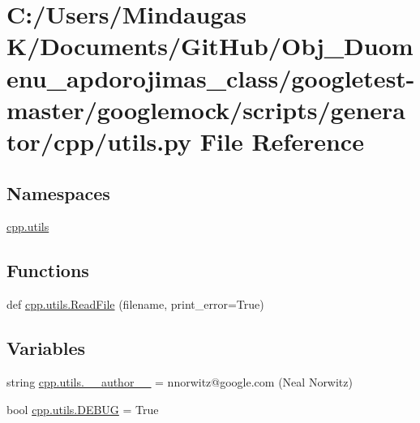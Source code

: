 \hypertarget{googletest-master_2googlemock_2scripts_2generator_2cpp_2utils_8py}{}\section{C\+:/\+Users/\+Mindaugas K/\+Documents/\+Git\+Hub/\+Obj\+\_\+\+Duomenu\+\_\+apdorojimas\+\_\+class/googletest-\/master/googlemock/scripts/generator/cpp/utils.py File Reference}
\label{googletest-master_2googlemock_2scripts_2generator_2cpp_2utils_8py}
\subsection*{Namespaces}
\begin{DoxyCompactItemize}
\item 
 \mbox{\hyperlink{namespacecpp_1_1utils}{cpp.\+utils}}
\end{DoxyCompactItemize}
\subsection*{Functions}
\begin{DoxyCompactItemize}
\item 
def \mbox{\hyperlink{namespacecpp_1_1utils_a4258aa53673d101d6f57320ec9a3c3a2}{cpp.\+utils.\+Read\+File}} (filename, print\+\_\+error=True)
\end{DoxyCompactItemize}
\subsection*{Variables}
\begin{DoxyCompactItemize}
\item 
string \mbox{\hyperlink{namespacecpp_1_1utils_a4881c422e2e8cfc2e4f716b6f7bb0b58}{cpp.\+utils.\+\_\+\+\_\+author\+\_\+\+\_\+}} = \textquotesingle{}nnorwitz@google.\+com (Neal Norwitz)\textquotesingle{}
\item 
bool \mbox{\hyperlink{namespacecpp_1_1utils_aa59cfd61e9b0495b717753e45fe9d201}{cpp.\+utils.\+D\+E\+B\+UG}} = True
\end{DoxyCompactItemize}
